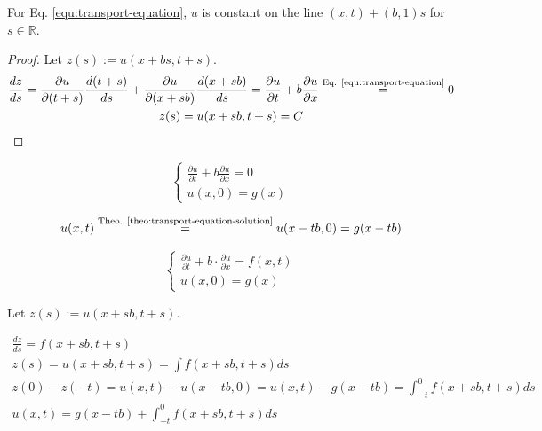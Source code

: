 \documentclass{blog}
\begin{document}
\begin{theorem}
    \label{theo:transport-equation-solution}
    For Eq. \ref{equ:transport-equation}, $u$ is constant on the line $(x,t) + (b,1)s$ for $s \in \mathbb{R}$.
\end{theorem}

\begin{proof}
    Let $z(s) := u(x+bs,t+s)$.
    \begin{gather*}
        \frac{dz}{ds} = \frac{\partial u}{\partial (t+s)}\frac{d(t+s)}{ds} + \frac{\partial u}{\partial (x+sb)}\frac{d (x+sb)}{ds}
        = \frac{\partial u}{\partial t} + b\frac{\partial u}{\partial x}
        \overset{\text{Eq. \ref{equ:transport-equation}}}{=} 0 \\
        z(s) = u(x+sb,t+s) = C
    \end{gather*}
\end{proof}

\begin{lemma}
    \begin{equation*}
        \begin{cases}
            \frac{\partial u}{\partial t} + b\frac{\partial u}{\partial x} = 0 \\
            u(x,0) = g(x)
        \end{cases}
    \end{equation*}

    \begin{equation*}
        u(x,t) \overset{\text{Theo. \ref{theo:transport-equation-solution}}}{=} u(x-tb,0) = g(x-tb)
    \end{equation*}
\end{lemma}

\begin{lemma}
    \begin{equation*}
        \begin{cases}
            \frac{\partial u}{\partial t} + b \cdot \frac{\partial u}{\partial x} = f(x,t) \\
            u(x,0) = g(x)
        \end{cases}
    \end{equation*}

    Let $z(s) := u(x+sb,t+s)$.

    \begin{gather*}
        \frac{dz}{ds} = f(x+sb,t+s) \\
        z(s) = u(x+sb,t+s) = \int f(x+sb,t+s) ds \\
        z(0) - z(-t) = u(x,t) - u(x-tb,0) = u(x,t) - g(x-tb) = \int_{-t}^{0} f(x+sb,t+s) ds \\
        u(x,t) = g(x-tb) + \int_{-t}^{0} f(x+sb,t+s) ds
    \end{gather*}
\end{lemma}
\end{document}

